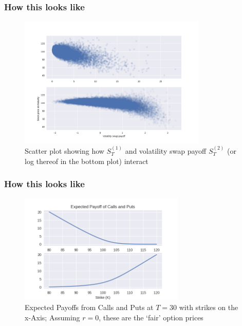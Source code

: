 \documentclass[serif]{beamer}
\begin{document}
\begin{frame}
    \frametitle{How this looks like}
    \begin{figure}
        \includegraphics[width=0.8\textwidth]{./images/vol_swap_scatter.png}
        \caption{
            Scatter plot showing how $S^{(1)}_T$ and volatility swap
            payoff $S^{(2)}_T$ (or log thereof in the bottom plot) interact
        }
    \end{figure}
\end{frame}

\begin{frame}
    \frametitle{How this looks like}
    \begin{figure}
        \includegraphics[width=0.7\textwidth]{./images/call_put_payoff.png}
        \caption{
            Expected Payoffs from Calls and Puts at $T=30$ with strikes
            on the x-Axis; Assuming $r=0$, these are the `fair' option prices
        }
    \end{figure}
\end{frame}
\end{document}
